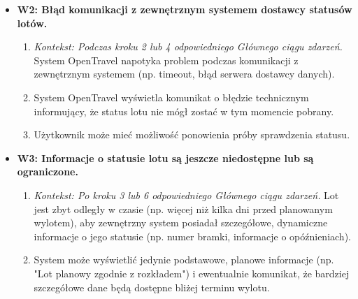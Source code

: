 \documentclass[a4paper,12pt]{article}
\begin{document}
\begin{itemize}
\begin{itemize}
\begin{enumerate}
                \end{enumerate}
            \item \textbf{W2: Błąd komunikacji z zewnętrznym systemem dostawcy statusów lotów.}
                \begin{enumerate}
                    \item \textit{Kontekst: Podczas kroku 2 lub 4 odpowiedniego Głównego ciągu zdarzeń.} System OpenTravel napotyka problem podczas komunikacji z zewnętrznym systemem (np. timeout, błąd serwera dostawcy danych).
                    \item System OpenTravel wyświetla komunikat o błędzie technicznym informujący, że status lotu nie mógł zostać w tym momencie pobrany.
                    \item Użytkownik może mieć możliwość ponowienia próby sprawdzenia statusu.
                \end{enumerate}
            \item \textbf{W3: Informacje o statusie lotu są jeszcze niedostępne lub są ograniczone.}
                \begin{enumerate}
                    \item \textit{Kontekst: Po kroku 3 lub 6 odpowiedniego Głównego ciągu zdarzeń.} Lot jest zbyt odległy w czasie (np. więcej niż kilka dni przed planowanym wylotem), aby zewnętrzny system posiadał szczegółowe, dynamiczne informacje o jego statusie (np. numer bramki, informacje o opóźnieniach).
                    \item System może wyświetlić jedynie podstawowe, planowe informacje (np. "Lot planowy zgodnie z rozkładem") i ewentualnie komunikat, że bardziej szczegółowe dane będą dostępne bliżej terminu wylotu.
                \end{enumerate}
        \end{itemize}
\end{itemize}
\end{document}
